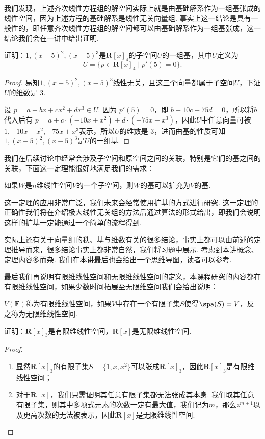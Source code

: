 我们发现，上述齐次线性方程组的解空间实际上就是由基础解系作为一组基张成的线性空间，因为上述方程的基础解系是线性无关向量组. 事实上这一结论是具有一般性的，即任意齐次线性方程组的解空间都可以由基础解系作为一组基张成，这一结论我们会在一讲中给出证明.

\begin{example}{}{}
    证明：$1,(x-5)^2,(x-5)^3$是$\mathbf{R}[x]_4$的子空间$U$的一组基，其中$U$定义为
    \[U=\{p\in\mathbf{R}[x]_4 \mid p'(5)=0\}.\]
\end{example}

\begin{proof}
    易知$1,(x-5)^2,(x-5)^3$线性无关，且这三个向量都属于子空间$U$，下证$U$的维数是 3.

    设 $p = a + bx + cx^2 + dx^3 \in U$. 因为 $p'(5) = 0$，即 $b + 10c +75d = 0$，所以将$b$代入后有 $p = a + c·(-10x + x^2) + d·(-75x + x^3)$，因此$U$中任意向量可被$1, -10x + x^2, -75x + x^3$表示，所以$U$的维数是 3，进而由基的性质可知$1,(x-5)^2,(x-5)^3$是$U$的一组基.
\end{proof}

我们在后续讨论中经常会涉及子空间和原空间之间的关联，特别是它们的基之间的关联，下面这一定理能很好地满足我们的需求：
\begin{theorem}{}{}
    如果$W$是$n$维线性空间$V$的一个子空间，则$W$的基可以扩充为$V$的基.
\end{theorem}
这一定理的应用非常广泛，我们未来会经常使用扩基的方式进行研究. 这一定理的正确性我们将在介绍极大线性无关组的方法后通过算法的形式给出，即我们会说明这样的扩基一定能通过一个简单的流程得到.

实际上还有关于向量组的秩、基与维数有关的很多结论，事实上都可以由前述的定理推导而来，很多结论事实上都非常自然，我们将习题中展示. 考虑到本讲概念、定理内容多而杂. 我们在本讲最后也会给出一个思维导图，读者可以参考.

最后我们再说明有限维线性空间和无限维线性空间的定义，本课程研究的内容都在有限维线性空间，如果少数时间拓展至无限维空间我们会给出说明：
\begin{definition}{}{}
    $V(\mathbf{F})$称为有限维线性空间，如果$V$中存在一个有限子集$S$使得$\spa(S)=V$，反之称为无限维线性空间.
\end{definition}

\begin{example}{}{}
    证明：$\mathbf{R}[x]_3$是有限维线性空间，$\mathbf{R}[x]$是无限维线性空间.
\end{example}

\begin{proof}
    \begin{enumerate}
        \item 显然$\mathbf{R}[x]_3$的有限子集$S=\{1,x,x^2\}$可以张成$\mathbf{R}[x]_3$，因此$\mathbf{R}[x]_3$是有限维线性空间；

        \item 对于$\mathbf{R}[x]$，我们只需证明其任意有限子集都无法张成其本身. 我们取其任意有限子集，则其中多项式元素的次数一定有最大值，我们记为$m$，那么$z^{m+1}$以及更高次数的无法被表示，因此$\mathbf{R}[x]$是无限维线性空间.
    \end{enumerate}
\end{proof}

